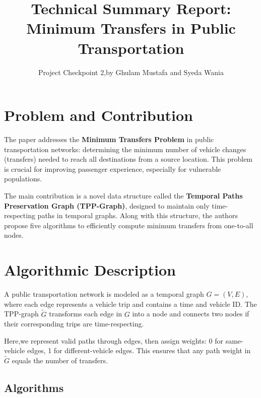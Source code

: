 \documentclass[11pt]{article}
\title{\vspace{-2em}Technical Summary Report:\\Minimum Transfers in Public Transportation\vspace{-1em}}
\author{Project Checkpoint 2,by Ghulam Mustafa and Syeda Wania}
\date{}
\begin{document}
\maketitle

\section{Problem and Contribution}

The paper addresses the \textbf{Minimum Transfers Problem} in public transportation networks: determining the minimum number of vehicle changes (transfers) needed to reach all destinations from a source location. This problem is crucial for improving passenger experience, especially for vulnerable populations.

The main contribution is a novel data structure called the \textbf{Temporal Paths Preservation Graph (TPP-Graph)}, designed to maintain only time-respecting paths in temporal graphs. Along with this structure, the authors propose five algorithms to efficiently compute minimum transfers from one-to-all nodes.

\section{Algorithmic Description}

A public transportation network is modeled as a temporal graph $G = (V, E)$, where each edge represents a vehicle trip and contains a time and vehicle ID. The TPP-graph $\tilde{G}$ transforms each edge in $G$ into a node and connects two nodes if their corresponding trips are time-respecting.

Here,we represent valid paths through edges, then assign weights: 0 for same-vehicle edges, 1 for different-vehicle edges. This ensures that any path weight in $\tilde{G}$ equals the number of transfers.

\subsection*{Algorithms}
\end{document}
